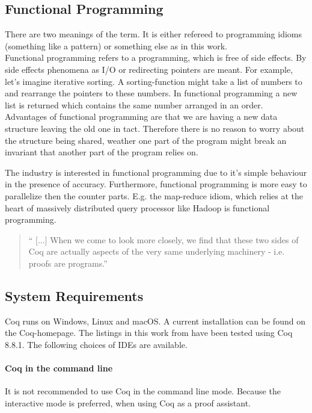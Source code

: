 \subsection{Functional Programming}
There are two meanings of the term. 
It is either refereed to programming idioms (something like a pattern) or something else as in this work.\\

Functional programming refers to a programming, which is free of side effects.
By side effects phenomena as I/O or redirecting pointers are meant. 
For example, let's imagine iterative sorting. 
A sorting-function might take a list of numbers to and rearrange the pointers to these numbers.
In functional programming a new list is returned which contains the same number arranged in an order.\\ 
Advantages of functional programming are  that we are having a new data structure leaving the old one in tact. 
Therefore there is no reason to worry about the structure being shared, weather one part of the program might break an invariant that another part of the program relies on.\par
The industry is interested in functional programming due to it's simple behaviour in the presence of accuracy.
Furthermore, functional programming is more easy to parallelize then the counter parts.
E.g. the map-reduce idiom, which relies at the heart of massively distributed query processor like \gls{Hadoop} is functional programming. 

\begin{quote}
`` [...] When we come to look more closely, we find that these two sides of Coq are actually aspects of the very same underlying machinery - i.e. proofs are programs.'' 
\end{quote}




\subsection{System Requirements}

Coq runs on Windows, Linux and macOS.
A current installation can be found on the Coq-homepage. 
The listings in this work from \cite{PACGGHSY} have been tested using Coq 8.8.1.
The following choices of IDEs are available. 

\paragraph{Coq in the command line}
It is not recommended to use Coq in the command line mode. 
Because the interactive mode is preferred, when using Coq as a proof assistant. 


